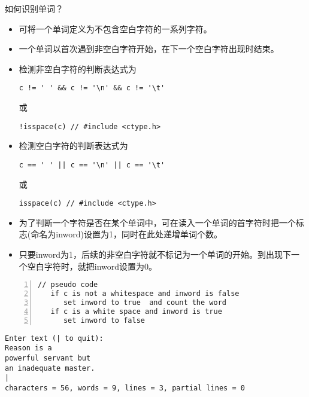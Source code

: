 \begin{frame}[fragile]\ft{\secname}
如何识别单词？ \pause \vspace{.1in}
\begin{itemize}
\item 可将一个单词定义为不包含空白字符的一系列字符。\\[0.15in]
\item 一个单词以首次遇到非空白字符开始，在下一个空白字符出现时结束。
\end{itemize}
\end{frame}

\begin{frame}[fragile]\ft{\secname}
\begin{itemize}
\item 检测非空白字符的判断表达式为
\begin{lstlisting}
c != ' ' && c != '\n' && c != '\t'
\end{lstlisting} 
或
\begin{lstlisting}
!isspace(c) // #include <ctype.h>
\end{lstlisting}\vspace{0.1in}

\item 检测空白字符的判断表达式为
\begin{lstlisting}
c == ' ' || c == '\n' || c == '\t'
\end{lstlisting}
或
\begin{lstlisting}
isspace(c) // #include <ctype.h>
\end{lstlisting}
\end{itemize}
\end{frame}

\begin{frame}[fragile]\ft{\secname}
\begin{itemize}
\item
为了判断一个字符是否在某个单词中，可在读入一个单词的首字符时把一个标志(命名为inword)设置为1，同时在此处递增单词个数。\\[.15in]
\item
只要inword为1，后续的非空白字符就不标记为一个单词的开始。到出现下一个空白字符时，就把inword设置为0。
\end{itemize}
\begin{lstlisting}[numbers=left]
// pseudo code
   if c is not a whitespace and inword is false
      set inword to true  and count the word
   if c is a white space and inword is true
      set inword to false   
\end{lstlisting}

\end{frame}

\begin{frame}\ft{\secname}

\end{frame}


\begin{frame}[fragile]\ft{\secname}
\begin{lstlisting}
Enter text (| to quit):
Reason is a 
powerful servant but
an inadequate master.
|
characters = 56, words = 9, lines = 3, partial lines = 0
\end{lstlisting}
\end{frame}

